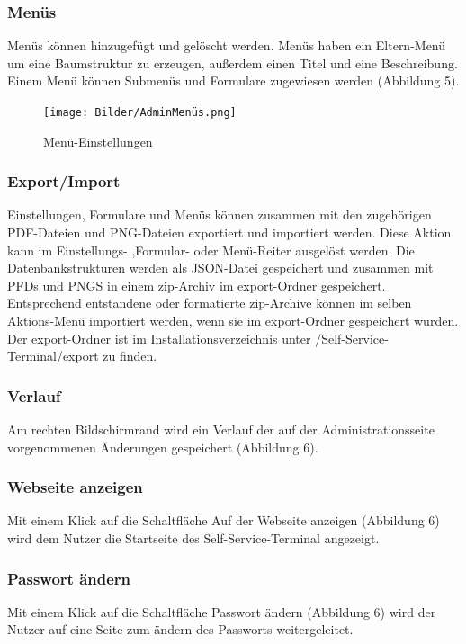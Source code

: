 \newpage

\subsubsection{Menüs} Menüs können hinzugefügt und gelöscht werden. Menüs haben ein Eltern-Menü um eine  Baumstruktur zu erzeugen, außerdem einen Titel und eine Beschreibung. Einem Menü können Submenüs und Formulare zugewiesen werden (Abbildung 5).

\begin{figure}[htp]
    \centering
    \texttt{[image: Bilder/AdminMenüs.png]}
    \caption[Startseite des Self-Service-Terminals]{Menü-Einstellungen}
    \label{fig:SSTAdminMenü}
\end{figure}

\newpage

\subsubsection{Export/Import}Einstellungen, Formulare und Menüs können zusammen mit den zugehörigen PDF-Dateien und PNG-Dateien exportiert und importiert werden. Diese Aktion kann im Einstellungs- ,Formular- oder Menü-Reiter ausgelöst werden. Die Datenbankstrukturen werden als JSON-Datei gespeichert und zusammen mit PFDs und PNGS in einem zip-Archiv im export-Ordner gespeichert. Entsprechend entstandene oder formatierte zip-Archive können im selben Aktions-Menü importiert werden, wenn sie im export-Ordner gespeichert wurden. Der export-Ordner ist im Installationsverzeichnis unter /Self-Service-Terminal/export zu finden.

\subsubsection{Verlauf} Am rechten Bildschirmrand wird ein Verlauf der auf der Administrationsseite vorgenommenen Änderungen gespeichert (Abbildung 6).

\subsubsection{Webseite anzeigen}Mit einem Klick auf die Schaltfläche \glqq Auf der Webseite anzeigen\grqq{} (Abbildung 6) wird dem Nutzer die Startseite des Self-Service-Terminal angezeigt.

\subsubsection{Passwort ändern} Mit einem Klick auf die Schaltfläche \glqq Passwort ändern\grqq{} (Abbildung 6) wird der Nutzer auf eine Seite zum ändern des Passworts weitergeleitet.

